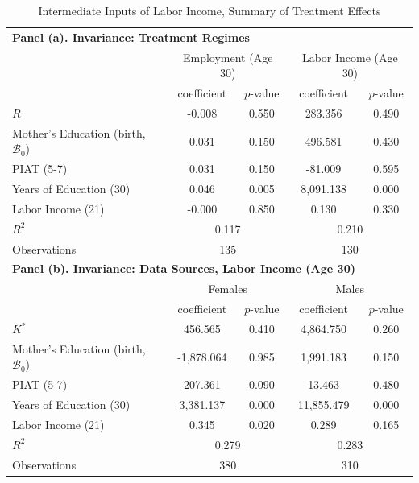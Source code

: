 \begin{table}[!htpb]
\begin{threeparttable}
\caption{Intermediate Inputs of Labor Income, Summary of Treatment Effects} \label{table:invariance}
\centering
\begin{tabular}{lcccc} \toprule
 \multicolumn{5}{l}{\textbf{Panel (a). Invariance: Treatment Regimes}} \\ 
       & \multicolumn{2}{c}{Employment (Age 30)} &   \multicolumn{2}{c}{Labor Income (Age 30)} \\
       			      & coefficient & $p$-value & coefficient & $p$-value \\
$R$ &-0.008 & 0.550 & 283.356 & 0.490 \\
Mother's Education (birth, $\mathcal{B}_{0}$) & 0.031 & 0.150 & 496.581 & 0.430 \\
PIAT (5-7) & 0.031 & 0.150 & -81.009 & 0.595 \\
Years of Education (30) & 0.046 & 0.005 & 8,091.138 & 0.000 \\
Labor Income (21) & -0.000 & 0.850 & 0.130 & 0.330 \\
$R^2$ & \multicolumn{2}{c}{0.117} & \multicolumn{2}{c}{0.210}  \\ 
Observations & \multicolumn{2}{c}{135} &  \multicolumn{2}{c}{130}  \\ \midrule
 \multicolumn{5}{l}{\textbf{Panel (b). Invariance: Data Sources, Labor Income (Age 30)}} \\
       & \multicolumn{2}{c}{Females} &   \multicolumn{2}{c}{Males} \\
       			      & coefficient & $p$-value & coefficient & $p$-value \\
$K^*$ & 456.565 & 0.410  & 4,864.750 & 0.260 \\
Mother's Education (birth, $\mathcal{B}_{0}$) & -1,878.064 & 0.985  & 1,991.183 & 0.150 \\
PIAT (5-7) & 207.361 & 0.090 & 13.463 & 0.480 \\
Years of Education (30) & 3,381.137 & 0.000 & 11,855.479 & 0.000 \\
Labor Income (21) & 0.345 & 0.020 & 0.289 & 0.165 \\ 
$R^2$ & \multicolumn{2}{c}{0.279}  & \multicolumn{2}{c}{0.283}  \\ 
Observations & \multicolumn{2}{c}{380} & \multicolumn{2}{c}{310} \\ \bottomrule
\end{tabular}
\begin{tablenotes}
\footnotesize

\end{tablenotes}
\end{threeparttable}
\end{table}
